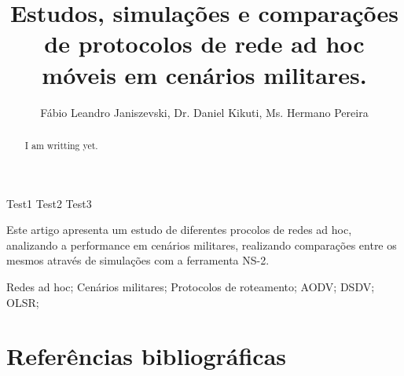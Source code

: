 \documentclass[12pt]{article}
\title{Estudos, simula\c{c}\~oes e compara\c{c}\~oes de protocolos de rede ad hoc m\'oveis em cen\'arios militares.}
\author{
	F\'abio Leandro Janiszevski\inst{1}, 
	Dr. Daniel Kikuti\inst{1}, 
	Ms. Hermano Pereira\inst{2}
}
\begin{document}
\maketitle

\begin{abstract}
I am writting yet.
\end{abstract}

\begin{keyWord}
Test1 Test2 Test3
\end{keyWord}

\begin{resumo}
Este artigo apresenta um estudo de diferentes procolos de redes ad hoc, analizando a performance em cen\'arios militares, realizando compara\c{c}\~oes entre os mesmos atrav\'es de simula\c{c}\~oes com a ferramenta NS-2.
\end{resumo}

\begin{palavraChave}
Redes ad hoc; Cen\'arios militares; Protocolos de roteamento; AODV; DSDV; OLSR;
\end{palavraChave}



\section{Refer\^encias bibliogr\'aficas}


\end{document}
